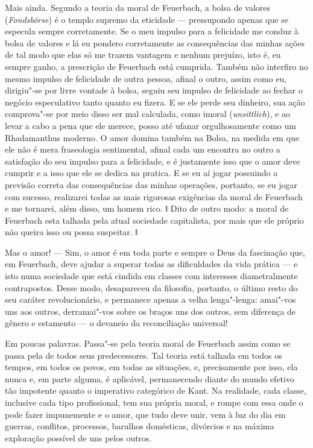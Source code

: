 Mais ainda. Segundo a teoria da moral
de Feuerbach,
a bolsa de valores (\emph{Fondsbörse}) é o templo supremo da eticidade ---
pressupondo apenas que se especula sempre corretamente. Se o meu impulso
para a felicidade me conduz à bolsa de valores e lá eu pondero
corretamente as consequências das minhas ações de tal modo que elas só
me trazem vantagem e nenhum prejuízo, isto é, eu sempre ganho, a
prescrição
de Feuerbach está
cumprida. Também não interfiro no mesmo impulso de felicidade de outra
pessoa, afinal o outro, assim como eu, dirigiu"-se por livre vontade à
bolsa, seguiu seu impulso de felicidade ao fechar o negócio especulativo
tanto quanto eu fizera. E se ele perde seu dinheiro, sua ação
comprova"-se por meio disso ser mal calculada, como imoral
(\emph{unsittlich}), e ao levar a cabo a pena que ele merece, posso até
ufanar orgulhosamente como um Rhadamanthus moderno. O amor domina também
na Bolsa, na medida em que ele não é mera fraseologia sentimental,
afinal cada um encontra no outro a satisfação do seu impulso para a
felicidade, e é justamente isso que o amor deve cumprir e a isso que ele
se dedica na pratica. E se eu aí jogar possuindo a previsão correta das
consequências das minhas operações, portanto, se eu jogar com sucesso,
realizarei todas as mais rigorosas exigências da moral
de Feuerbach e
me tornarei, além disso, um homem rico. ǁ Dito de outro modo: a moral
de Feuerbach esta
talhada pela atual sociedade capitalista, por mais que ele próprio não
queira isso ou possa suspeitar. ǁ

Mas o amor! --- Sim, o amor é em toda parte e sempre o Deus da fascinação
que,
em Feuerbach,
deve ajudar a superar todas as dificuldades da vida prática --- e isto
numa sociedade que está cindida em classes com interesses diametralmente
contrapostos. Desse modo, desapareceu da filosofia, portanto, o último
resto do seu caráter revolucionário, e permanece apenas a velha
lenga"-lenga: amai"-vos uns aos outros, derramai"-vos sobre os braços uns
dos outros, sem diferença de gênero e estamento --- o devaneio da
reconciliação universal!

Em poucas palavras. Passa"-se pela teoria moral
de Feuerbach
assim como se passa pela de todos seus predecessores. Tal teoria está
talhada em todos os tempos, em todos os povos, em todas as situações, e,
precisamente por isso, ela nunca e, em parte alguma, é aplicável,
permanecendo diante do mundo efetivo tão impotente quanto o imperativo
categórico
de Kant.
Na realidade, cada classe, inclusive cada tipo profissional, tem sua
própria moral, e rompe com essa onde o pode fazer impunemente e o amor,
que tudo deve unir, vem à luz do dia em guerras, conflitos, processos,
barulhos domésticas, divórcios e na máxima exploração possível de uns
pelos outros.

